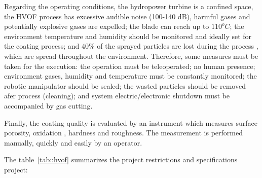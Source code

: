  

Regarding the operating conditions, the hydropower turbine is a confined
space, the HVOF process has excessive audible noise (100-140 dB), harmful gases
and potentially explosive gases are expelled; the blade can reach up to
$110^oC$; the environment temperature and humidity should be monitored and
ideally set for the coating process; and $40\%$ of the sprayed particles are
lost during the process \citep{wu2006rebound}, which are spread throughout
the environment. Therefore, some measures must be taken for the execution: the
operation must be teleoperated; no human presence; environment gases, humidity
and temperature must be constantly monitored; the robotic manipulator should be
sealed; the wasted particles should be removed afer process (cleaning); and
system electric/electronic shutdown must be accompanied by gas cutting.

Finally, the coating quality is evaluated by an instrument which measures
surface porosity, oxidation , hardness and roughness. The measurement is
performed manually, quickly and easily by an operator.


The table~\ref{tab::hvof} summarizes the project restrictions and specifications
project:

